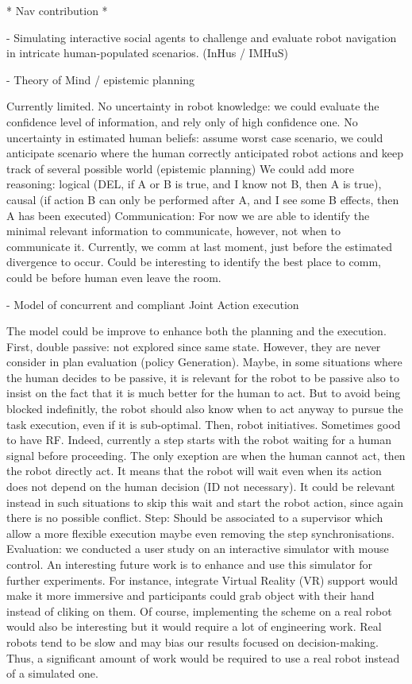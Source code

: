* Nav contribution *

- Simulating interactive social agents to challenge and evaluate robot navigation in intricate human-populated scenarios. (InHus / IMHuS)


- Theory of Mind / epistemic planning

Currently limited. 
No uncertainty in robot knowledge: we could evaluate the confidence level of information, and rely only of high confidence one.
No uncertainty in estimated human beliefs: assume worst case scenario, we could anticipate scenario where the human correctly anticipated robot actions and keep track of several possible world (epistemic planning)
We could add more reasoning: logical (DEL, if A or B is true, and I know not B, then A is true), causal (if action B can only be performed after A, and I see some B effects, then A has been executed)
Communication: For now we are able to identify the minimal relevant information to communicate, however, not when to communicate it. Currently, we comm at last moment, just before the estimated divergence to occur. Could be interesting to identify the best place to comm, could be before human even leave the room.

- Model of concurrent and compliant Joint Action execution

The model could  be improve to enhance both the planning and the execution.
First, double passive: not explored since same state. However, they are never consider in plan evaluation (policy Generation). Maybe, in some situations where the human decides to be passive, it is relevant for the robot to be passive also to insist on the fact that it is much better for the human to act. But to avoid being blocked indefinitly, the robot should also know when to act anyway to pursue the task execution, even if it is sub-optimal.
Then, robot initiatives. Sometimes good to have RF. Indeed, currently a step starts with the robot waiting for a human signal before proceeding. The only exeption are when the human cannot act, then the robot directly act. It means that the robot will wait even when its action does not depend on the human decision (ID not necessary). It could be relevant instead in such situations to skip this wait and start the robot action, since again there is no possible conflict.   
Step: Should be associated to a supervisor which allow a more flexible execution maybe even removing the step synchronisations. 
Evaluation: we conducted a user study on an interactive simulator with mouse control. An interesting future work is to enhance and use this simulator for further experiments. For instance, integrate Virtual Reality (VR) support would make it more immersive and participants could grab object with their hand instead of cliking on them. Of course, implementing the scheme on a real robot would also be interesting but it would require a lot of engineering work. Real robots tend to be slow and may bias our results focused on decision-making. Thus, a significant amount of work would be required to use a real robot instead of a simulated one. 

